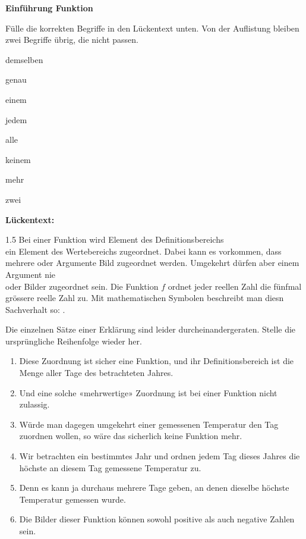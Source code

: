 \documentclass[11pt]{exam}
\newcommand{\theme}{Einführung Funktion}
\begin{document}
\fontsize{14}{14}\selectfont
\begin{center}
    \huge\bf\theme
\end{center}

\begin{questions}
\question[3]
Fülle die korrekten Begriffe in den Lückentext unten. Von der Auflistung bleiben zwei Begriffe übrig, die nicht passen.
\begin{itemcols}[4]
	\item demselben
	\item genau
	\item einem
	\item jedem
	\item alle
	\item keinem
	\item mehr
	\item zwei
\end{itemcols}\vspace*{14pt}
{\bf Lückentext:}
\begin{spacing}{1.5}
	{\Large Bei einer Funktion wird  Element des Definitionsbereichs\\  ein Element des Wertebereichs zugeordnet. Dabei kann es vorkommen, dass mehrere oder  Argumente  Bild zugeordnet werden. Umgekehrt dürfen aber einem Argument nie\\   oder  Bilder zugeordnet sein.\vspace*{11pt}\newline
		Die Funktion $f$ ordnet jeder reellen Zahl die fünfmal grössere reelle Zahl zu. Mit mathematischen Symbolen beschreibt man diesn Sachverhalt so: .}
\end{spacing}


\question[4]
Die einzelnen Sätze einer Erklärung sind leider durcheinandergeraten. Stelle die ursprüngliche Reihenfolge wieder her.
\begin{enumerate}
	\item Diese Zuordnung ist sicher eine Funktion, und ihr Definitionsbereich ist die Menge aller Tage des betrachteten Jahres.
	\item Und eine solche «mehrwertige» Zuordnung ist bei einer Funktion nicht zulassig.
	\item Würde man dagegen umgekehrt einer gemessenen Temperatur den Tag zuordnen wollen, so wäre das sicherlich keine Funktion mehr.
	\item Wir betrachten ein bestimmtes Jahr und ordnen jedem Tag dieses Jahres die höchste an diesem Tag gemessene Temperatur zu.
	\item Denn es kann ja durchaus mehrere Tage geben, an denen dieselbe höchste
	Temperatur gemessen wurde.
	\item Die Bilder dieser Funktion können sowohl positive als auch negative Zahlen sein.
\end{enumerate}



\end{questions}
\end{document}
